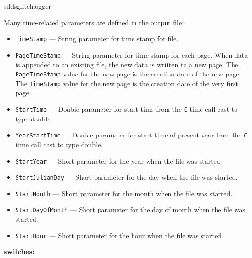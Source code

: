 \begin{sddsprog}{sddsglitchlogger}
\begin{itemize}
Many time-related parameters are defined in the output file:
\begin{itemize}
        \item {\tt TimeStamp} --- String parameter for time stamp for file.
        \item {\tt PageTimeStamp} --- String parameter for time stamp for each page. When data
                is appended to an existing file, the new data is written to a new
                page. The {\tt PageTimeStamp} value for the new page is the creation
                date of the new page. The {\tt TimeStamp} value for the new page is the creation 
                date of the very first page.
        \item {\tt StartTime} --- Double parameter for start time from the {\tt C} time call cast to type double.
        \item {\tt YearStartTime} --- Double parameter for start time of present year from the {\tt C} time call cast to type double.
        \item {\verb+StartYear+} --- Short parameter for the year when the file was started.
        \item {\verb+StartJulianDay+} --- Short parameter for the day when the file was started.
        \item {\verb+StartMonth+} --- Short parameter for the month when the file was started.
        \item {\verb+StartDayOfMonth+} --- Short parameter for the day of month when the file was started.
        \item {\verb+StartHour+} --- Short parameter for the hour when the file was started.
\end{itemize}
\end{itemize}

%
\item {\bf switches:}
%
%
    \begin{itemize}


\end{itemize}
\end{sddsprog}
